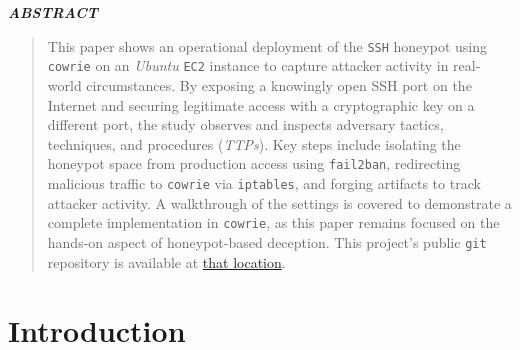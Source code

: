 \documentclass{cls/ULBreport}
\renewenvironment{abstract}{%
  \clearpage
  \thispagestyle{plain}
  \begin{center}
    \bfseries\itshape ABSTRACT
  \end{center}
  \vspace{0.5cm}
  \begin{quote}
    \itshape
    \justifying
}{%
  \end{quote}
  \clearpage
}
\begin{document}
    
    \renewcommand{\rmdefault}{cmr} %
    \renewcommand{\sfdefault}{cmss} %
    \renewcommand{\ttdefault}{cmtt} %
    
    \makeatletter
    \renewcommand{\reset@font}{\normalfont\@setfontsize\f@size{12}{14.4}}
    \makeatother
    \normalfont


    \begin{abstract}        
    This paper shows an operational deployment of the \texttt{SSH} honeypot using \texttt{cowrie} on an \textit{Ubuntu} \texttt{EC2} instance to capture attacker activity in real-world circumstances. By exposing a knowingly open SSH port on the Internet and securing legitimate access with a cryptographic key on a different port, the study observes and inspects adversary tactics, techniques, and procedures (\textit{TTPs}). Key steps include isolating the honeypot space from production access using \texttt{fail2ban}, redirecting malicious traffic to \texttt{cowrie} via \texttt{iptables}, and forging artifacts to track attacker activity. A walkthrough of the settings is covered to demonstrate a complete implementation in \texttt{cowrie}, as this paper remains focused on the hands-on aspect of honeypot-based deception. This project's public \texttt{git} repository is available at \href{https://github.com/nottoBD/netsec-cowrie-honey}{that location}.
    \end{abstract}
    \newpage


    \section{Introduction}
\end{document}
